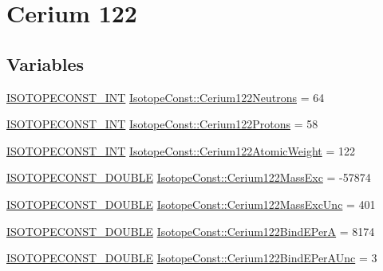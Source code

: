\hypertarget{group___isotope_const-_cerium-_ce122}{}\section{Cerium 122}
\label{group___isotope_const-_cerium-_ce122}
\subsection*{Variables}
\begin{DoxyCompactItemize}
\item 
\mbox{\hyperlink{group___isotope_const-_macros_ga5f18360b3e99483a35c32d789e62621c}{I\+S\+O\+T\+O\+P\+E\+C\+O\+N\+S\+T\+\_\+\+I\+NT}} \mbox{\hyperlink{group___isotope_const-_cerium-_ce122_ga9c3d0d122211e4fd5ed0d0afb7c6fa10}{Isotope\+Const\+::\+Cerium122\+Neutrons}} = 64
\item 
\mbox{\hyperlink{group___isotope_const-_macros_ga5f18360b3e99483a35c32d789e62621c}{I\+S\+O\+T\+O\+P\+E\+C\+O\+N\+S\+T\+\_\+\+I\+NT}} \mbox{\hyperlink{group___isotope_const-_cerium-_ce122_gab5ed3a738d46e86bee4f37a1bcb97f0d}{Isotope\+Const\+::\+Cerium122\+Protons}} = 58
\item 
\mbox{\hyperlink{group___isotope_const-_macros_ga5f18360b3e99483a35c32d789e62621c}{I\+S\+O\+T\+O\+P\+E\+C\+O\+N\+S\+T\+\_\+\+I\+NT}} \mbox{\hyperlink{group___isotope_const-_cerium-_ce122_gaf906fae92e5417387552141556796959}{Isotope\+Const\+::\+Cerium122\+Atomic\+Weight}} = 122
\item 
\mbox{\hyperlink{group___isotope_const-_macros_ga8f45a7272ce02c0b4c65c44636ed719a}{I\+S\+O\+T\+O\+P\+E\+C\+O\+N\+S\+T\+\_\+\+D\+O\+U\+B\+LE}} \mbox{\hyperlink{group___isotope_const-_cerium-_ce122_ga9af8162702faff50f4bc284b889e931e}{Isotope\+Const\+::\+Cerium122\+Mass\+Exc}} = -\/57874
\item 
\mbox{\hyperlink{group___isotope_const-_macros_ga8f45a7272ce02c0b4c65c44636ed719a}{I\+S\+O\+T\+O\+P\+E\+C\+O\+N\+S\+T\+\_\+\+D\+O\+U\+B\+LE}} \mbox{\hyperlink{group___isotope_const-_cerium-_ce122_ga486cb7298ef922b2216d18b8e398ac3e}{Isotope\+Const\+::\+Cerium122\+Mass\+Exc\+Unc}} = 401
\item 
\mbox{\hyperlink{group___isotope_const-_macros_ga8f45a7272ce02c0b4c65c44636ed719a}{I\+S\+O\+T\+O\+P\+E\+C\+O\+N\+S\+T\+\_\+\+D\+O\+U\+B\+LE}} \mbox{\hyperlink{group___isotope_const-_cerium-_ce122_gae554ee4abda0ac634f00bca3c4128330}{Isotope\+Const\+::\+Cerium122\+Bind\+E\+PerA}} = 8174
\item 
\mbox{\hyperlink{group___isotope_const-_macros_ga8f45a7272ce02c0b4c65c44636ed719a}{I\+S\+O\+T\+O\+P\+E\+C\+O\+N\+S\+T\+\_\+\+D\+O\+U\+B\+LE}} \mbox{\hyperlink{group___isotope_const-_cerium-_ce122_gaa204e04f6ae19364f45650cab92766f1}{Isotope\+Const\+::\+Cerium122\+Bind\+E\+Per\+A\+Unc}} = 3

\end{DoxyCompactItemize}
